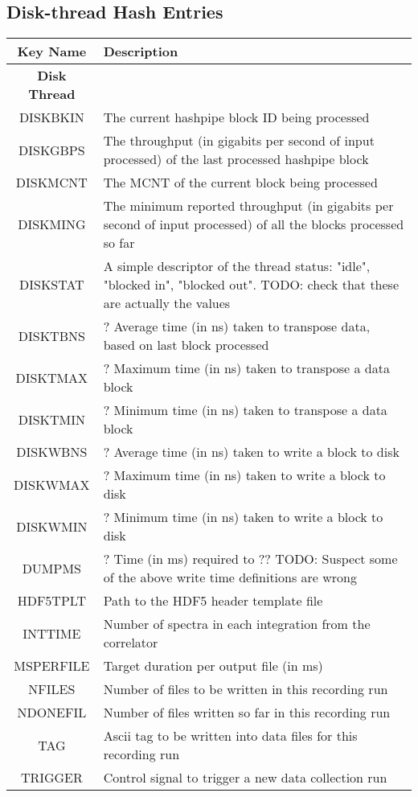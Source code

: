 \documentclass{article}
\begin{document}
\subsection{Disk-thread Hash Entries}
\begin{centering}
\begin{tabular}{c p{}}
\hline
Key Name & Description \\
\hline
\hline
\textbf{Disk Thread} & \\
DISKBKIN & The current hashpipe block ID being processed \\
DISKGBPS & The throughput (in gigabits per second of input processed) of the last processed hashpipe block \\
DISKMCNT & The MCNT of the current block being processed \\
DISKMING & The minimum reported throughput (in gigabits per second of input processed) of all the blocks processed so far \\
DISKSTAT & A simple descriptor of the thread status: "idle", "blocked in", "blocked out". TODO: check that these are actually the values \\
DISKTBNS & ? Average time (in ns) taken to transpose data, based on last block processed \\
DISKTMAX & ? Maximum time (in ns) taken to transpose a data block \\
DISKTMIN & ? Minimum time (in ns) taken to transpose a data block \\
DISKWBNS & ? Average time (in ns) taken to write a block to disk \\
DISKWMAX & ? Maximum time (in ns) taken to write a block to disk \\
DISKWMIN & ? Minimum time (in ns) taken to write a block to disk \\
DUMPMS   & ? Time (in ms) required to ?? TODO: Suspect some of the above write time definitions are wrong \\
HDF5TPLT & Path to the HDF5 header template file \\
INTTIME  & Number of spectra in each integration from the correlator \\
MSPERFILE & Target duration per output file (in ms) \\
NFILES   & Number of files to be written in this recording run \\
NDONEFIL & Number of files written so far in this recording run \\
TAG      & Ascii tag to be written into data files for this recording run \\
TRIGGER  & Control signal to trigger a new data collection run \\

\end{tabular}
\end{centering}
\end{document}
